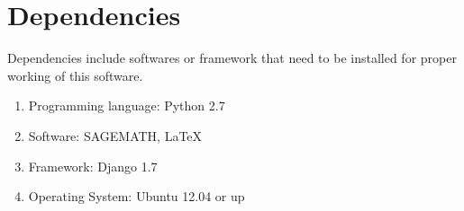 \section{Dependencies}
Dependencies include softwares or framework that need to be installed for 
proper working of this software.

\begin{enumerate} 
\item Programming language: Python 2.7
\item Software: SAGEMATH, \LaTeX{}
\item Framework: Django 1.7
\item Operating System: Ubuntu 12.04 or up
\end{enumerate}

